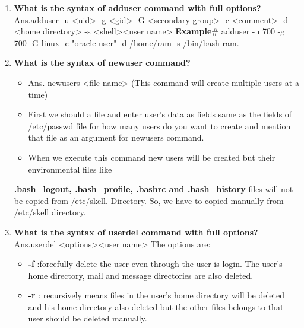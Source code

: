 \begin{enumerate}
    \bigskip
    \bigskip

    \item\textbf {What is the syntax of adduser  command with full options?}
    \newline
     Ans.adduser  -u <uid>  -g <gid>  -G <secondary group> -c  <comment>  -d <home
    directory> -s <shell><user name>
    \newline
    \textbf{Example}\# adduser  -u  700  -g  700  -G  linux   -c  "oracle user"   -d  /home/ram   -s
    /bin/bash ram.

    \bigskip
    \bigskip
    
    \item\textbf{What is the syntax of newuser command?}
    \begin{itemize}
        \item Ans. newusers   <file name>	(This command will create multiple users at a time)
        \item First we should a file and enter user's data as fields same as the fields of /etc/passwd file for how many users do you want to create and mention that file as an argument for newusers command.
        \item When we execute this command new users will be created but their environmental files like        
    \end{itemize}  
        \textbf{.bash\_logout, .bash\_profile, .bashrc and .bash\_history}  files will not be copied from /etc/skell.
         Directory. So, we have to  copied manually from  /etc/skell   directory.

     \bigskip
     \bigskip
     
     \item\textbf{What is the syntax of userdel command with full options?}
     \newline
      Ans.userdel <options><user name>
      \newline
      The options are:
      \begin{itemize}
          \item \textbf{-f} :forcefully delete the user even through the user is login. The user's home directory, mail and message directories are also deleted. 
          \item \textbf{-r} : recursively means files in the user's home directory will be deleted and  his  home directory also deleted but the other files belongs to that user should be   deleted manually.
	  \end{itemize}
    \bigskip
    \bigskip


\end{enumerate}
